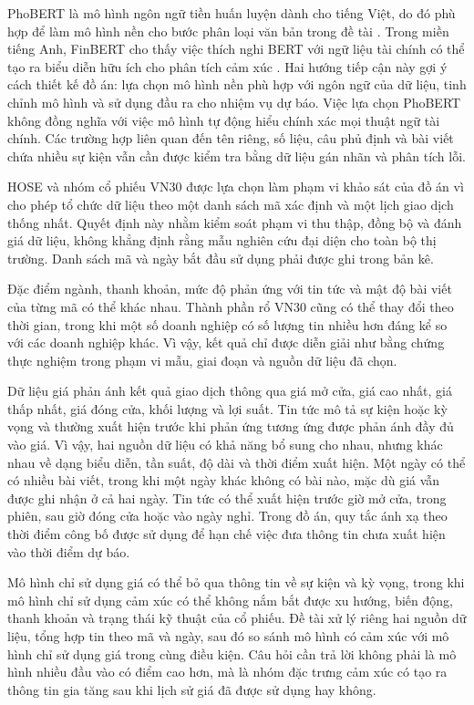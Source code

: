 \documentclass[12pt, a4paper, oneside]{report}
\begin{document}
PhoBERT là mô hình ngôn ngữ tiền huấn luyện dành cho tiếng Việt, do đó phù hợp để làm
mô hình nền cho bước phân loại văn bản trong đề tài \cite{Nguyen2020_200300744v3}.
Trong miền tiếng Anh, FinBERT cho thấy việc thích nghi BERT với ngữ liệu tài chính có
thể tạo ra biểu diễn hữu ích cho phân tích cảm xúc \cite{Yang2020_200608097v2}. Hai
hướng tiếp cận này gợi ý cách thiết kế đồ án: lựa chọn mô hình nền phù hợp với ngôn ngữ
của dữ liệu, tinh chỉnh mô hình và sử dụng đầu ra cho nhiệm vụ dự báo. Việc lựa chọn
PhoBERT không đồng nghĩa với việc mô hình tự động hiểu chính xác mọi thuật ngữ tài
chính. Các trường hợp liên quan đến tên riêng, số liệu, câu phủ định và bài viết chứa
nhiều sự kiện vẫn cần được kiểm tra bằng dữ liệu gán nhãn và phân tích lỗi.

HOSE và nhóm cổ phiếu VN30 được lựa chọn làm phạm vi khảo sát của đồ án vì cho phép
tổ chức dữ liệu theo một danh sách mã xác định và một lịch giao dịch thống nhất. Quyết
định này nhằm kiểm soát phạm vi thu thập, đồng bộ và đánh giá dữ liệu, không khẳng định
rằng mẫu nghiên cứu đại diện cho toàn bộ thị trường. Danh sách mã và ngày bắt đầu sử
dụng phải được ghi trong bản kê.

Đặc điểm ngành, thanh khoản, mức độ phản ứng với tin tức và mật độ bài viết của từng
mã có thể khác nhau. Thành phần rổ VN30 cũng có thể thay đổi theo thời gian, trong khi
một số doanh nghiệp có số lượng tin nhiều hơn đáng kể so với các doanh nghiệp khác.
Vì vậy, kết quả chỉ được diễn giải như bằng chứng thực nghiệm trong phạm vi mẫu, giai
đoạn và nguồn dữ liệu đã chọn.

Dữ liệu giá phản ánh kết quả giao dịch thông qua giá mở cửa, giá cao nhất, giá thấp
nhất, giá đóng cửa, khối lượng và lợi suất. Tin tức mô tả sự kiện hoặc kỳ vọng và
thường xuất hiện trước khi phản ứng tương ứng được phản ánh đầy đủ vào giá. Vì vậy, hai
nguồn dữ liệu có khả năng bổ sung cho nhau, nhưng khác nhau về dạng biểu diễn, tần suất,
độ dài và thời điểm xuất hiện. Một ngày có thể có nhiều bài viết, trong khi một ngày
khác không có bài nào, mặc dù giá vẫn được ghi nhận ở cả hai ngày. Tin tức có thể xuất
hiện trước giờ mở cửa, trong phiên, sau giờ đóng cửa hoặc vào ngày nghỉ. Trong đồ án,
quy tắc ánh xạ theo thời điểm công bố được sử dụng để hạn chế việc đưa thông tin chưa
xuất hiện vào thời điểm dự báo.

Mô hình chỉ sử dụng giá có thể bỏ qua thông tin về sự kiện và kỳ vọng, trong khi mô
hình chỉ sử dụng cảm xúc có thể không nắm bắt được xu hướng, biến động, thanh khoản và
trạng thái kỹ thuật của cổ phiếu. Đề tài xử lý riêng hai nguồn dữ liệu, tổng hợp tin
theo mã và ngày, sau đó so sánh mô hình có cảm xúc với mô hình chỉ sử dụng giá trong
cùng điều kiện. Câu hỏi cần trả lời không phải là mô hình nhiều đầu vào có điểm cao hơn, mà là nhóm đặc
trưng cảm xúc có tạo ra thông tin gia tăng sau khi lịch sử giá đã được sử dụng hay không.
\end{document}
